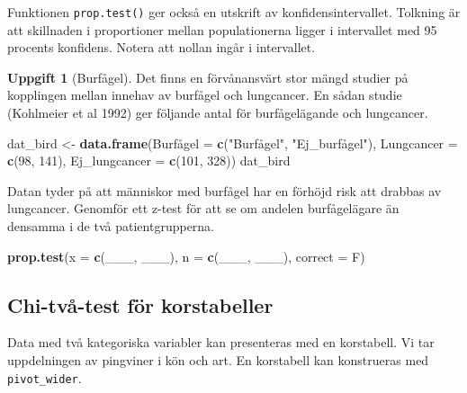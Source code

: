 \documentclass[
]{book}
\newenvironment{Shaded}{\begin{snugshade}}{\end{snugshade}}
\newcommand{\AttributeTok}[1]{\textcolor[rgb]{0.13,0.29,0.53}{#1}}
\newcommand{\DecValTok}[1]{\textcolor[rgb]{0.00,0.00,0.81}{#1}}
\newcommand{\FunctionTok}[1]{\textcolor[rgb]{0.13,0.29,0.53}{\textbf{#1}}}
\newcommand{\NormalTok}[1]{#1}
\newcommand{\OtherTok}[1]{\textcolor[rgb]{0.56,0.35,0.01}{#1}}
\newcommand{\StringTok}[1]{\textcolor[rgb]{0.31,0.60,0.02}{#1}}
\theoremstyle{definition}
\theoremstyle{definition}
\theoremstyle{definition}
\newtheorem{exercise}{Uppgift}[chapter]
\theoremstyle{definition}
\theoremstyle{remark}
\begin{document}
Funktionen \texttt{prop.test()} ger också en utskrift av konfidensintervallet. Tolkning är att skillnaden i proportioner mellan populationerna ligger i intervallet med 95 procents konfidens. Notera att nollan ingår i intervallet.

\begin{exercise}[Burfågel]

Det finns en förvånansvärt stor mängd studier på kopplingen mellan innehav av burfågel och lungcancer. En sådan studie (Kohlmeier et al 1992) ger följande antal för burfågelägande och lungcancer.

\begin{Shaded}
\begin{Highlighting}[]
\NormalTok{dat\_bird }\OtherTok{\textless{}{-}} \FunctionTok{data.frame}\NormalTok{(Burfågel }\OtherTok{=} \FunctionTok{c}\NormalTok{(}\StringTok{"Burfågel"}\NormalTok{, }\StringTok{"Ej\_burfågel"}\NormalTok{),}
              \AttributeTok{Lungcancer =} \FunctionTok{c}\NormalTok{(}\DecValTok{98}\NormalTok{, }\DecValTok{141}\NormalTok{),}
              \AttributeTok{Ej\_lungcancer =} \FunctionTok{c}\NormalTok{(}\DecValTok{101}\NormalTok{, }\DecValTok{328}\NormalTok{))}
\NormalTok{dat\_bird}
\end{Highlighting}
\end{Shaded}

Datan tyder på att människor med burfågel har en förhöjd risk att drabbas av lungcancer. Genomför ett z-test för att se om andelen burfågelägare än densamma i de två patientgrupperna.

\begin{Shaded}
\begin{Highlighting}[]
\FunctionTok{prop.test}\NormalTok{(}\AttributeTok{x =} \FunctionTok{c}\NormalTok{(\_\_\_, \_\_\_), }\AttributeTok{n =} \FunctionTok{c}\NormalTok{(\_\_\_, \_\_\_), }\AttributeTok{correct =}\NormalTok{ F)}
\end{Highlighting}
\end{Shaded}

\end{exercise}

\subsection{Chi-två-test för korstabeller}\label{chi-tvuxe5-test-fuxf6r-korstabeller}

Data med två kategoriska variabler kan presenteras med en korstabell. Vi tar uppdelningen av pingviner i kön och art.
En korstabell kan konstrueras med \texttt{pivot\_wider}.
\end{document}
